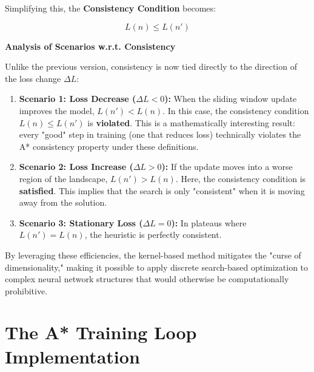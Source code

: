 Simplifying this, the \textbf{Consistency Condition} becomes:

$$L(n) \le L(n')$$

\noindent \textbf{Analysis of Scenarios w.r.t. Consistency}

Unlike the previous version, consistency is now tied directly to the direction of the loss change $\Delta L$:

\begin{enumerate}
    \item \textbf{Scenario 1: Loss Decrease ($\Delta L < 0$):}
    When the sliding window update improves the model, $L(n') < L(n)$. In this case, the consistency condition $L(n) \le L(n')$ is \textbf{violated}. This is a mathematically interesting result: every "good" step in training (one that reduces loss) technically violates the A* consistency property under these definitions.
    
    \item \textbf{Scenario 2: Loss Increase ($\Delta L > 0$):}
    If the update moves into a worse region of the landscape, $L(n') > L(n)$. Here, the consistency condition is \textbf{satisfied}. This implies that the search is only "consistent" when it is moving away from the solution.
    
    \item \textbf{Scenario 3: Stationary Loss ($\Delta L = 0$):}
    In plateaus where $L(n') = L(n)$, the heuristic is perfectly consistent.
\end{enumerate}


By leveraging these efficiencies, the kernel-based method mitigates the "curse of dimensionality," making it possible to apply discrete search-based optimization to complex neural network structures that would otherwise be computationally prohibitive.%


\section{The A* Training Loop Implementation}

